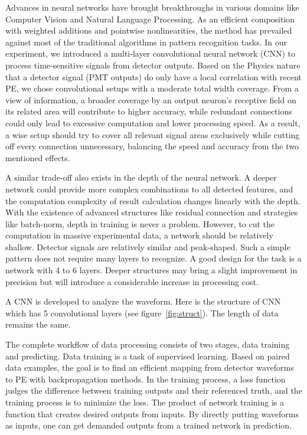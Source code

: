 Advances in neural networks have brought breakthroughs in various domains like Computer Vision and Natural Language Processing. As an efficient composition with weighted additions and pointwise nonlinearities, the method has prevailed against most of the traditional algorithms in pattern recognition tasks. In our experiment, we introduced a multi-layer convolutional neural network (CNN) to process time-sensitive signals from detector outputs. Based on the Physics nature that a detector signal (PMT outputs) do only have a local correlation with recent PE, we chose convolutional setups with a moderate total width coverage. From a view of information, a broader coverage by an output neuron's receptive field on its related area will contribute to higher accuracy, while redundant connections could only lead to excessive computation and lower processing speed. As a result, a wise setup should try to cover all relevant signal areas exclusively while cutting off every connection unnecessary, balancing the speed and accuracy from the two mentioned effects.

A similar trade-off also exists in the depth of the neural network. A deeper network could provide more complex combinations to all detected features, and the computation complexity of result calculation changes linearly with the depth. With the existence of advanced structures like residual connection and strategies like batch-norm, depth in training is never a problem. However, to cut the computation in massive experimental data, a network should be relatively shallow. Detector signals are relatively similar and peak-shaped. Such a simple pattern does not require many layers to recognize. A good design for the task is a network with 4 to 6 layers. Deeper structures may bring a slight improvement in precision but will introduce a considerable increase in processing cost.

A CNN is developed to analyze the waveform. Here is the structure of CNN which has 5 convolutional layers (see figure~\ref{fig:struct}). The length of data remains the same. 


The complete workflow of data processing consists of two stages, data training and predicting. Data training is a task of supervised learning.  Based on paired data examples, the goal is to find an efficient mapping from detector waveforms to PE with backpropagation methods. In the training process, a loss function judges the difference between training outputs and their referenced truth, and the training process is to minimize the loss. The product of network training is a function that creates desired outputs from inputs. By directly putting waveforms as inputs, one can get demanded outputs from a trained network in prediction.

